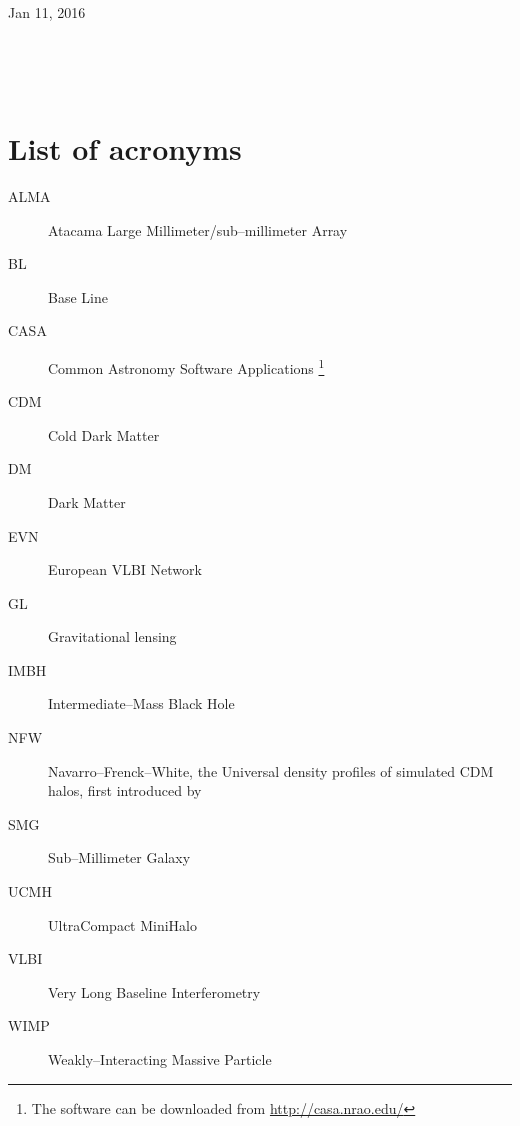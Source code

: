 \documentclass[a4wide,12pt]{book}
\begin{document}
\vspace{1.2cm}

\begin{center}
\large{Jan 11, 2016}\\
\end{center}
\thispagestyle{empty}
\fancyhf{}
\fancyhead{}
\rule[1cm]{0cm}{0.0cm} \\
\scriptsize{\emph{}\\
\clearpage
\normalsize
{}
\fancyhf{}
\fancyhead{}

\renewcommand{\chaptername}{}
\renewcommand{\chaptermark}[1]{\markboth{#1}{}}
\renewcommand{\sectionmark}[1]{\markright{#1}{}}
\fancyhead[RE]{\it \textbf{ }}

\fancyhead[LE]{\thepage}
\fancyhead[RO]{\thepage}

\renewcommand{\headrulewidth}{0.4pt}



\chapter*{List of acronyms}

\begin{description}
\item[ALMA]
Atacama Large Millimeter/sub--millimeter Array
\item[BL]
Base Line
\item[CASA]
Common Astronomy Software Applications \footnote{The software can be downloaded from \url{http://casa.nrao.edu/}}
\item[CDM]
Cold Dark Matter
\item[DM]
Dark Matter
\item[EVN]
European VLBI Network
\item[GL]
Gravitational lensing
\item[IMBH]
Intermediate--Mass Black Hole
\item[NFW]
Navarro--Frenck--White, the Universal density profiles of simulated CDM halos, first introduced by \citet{NFW}
\item[SMG]
Sub--Millimeter Galaxy
\item[UCMH]
UltraCompact MiniHalo
\item[VLBI]
Very Long Baseline Interferometry
\item[WIMP]
Weakly--Interacting Massive Particle
\end{description}

\clearpage

}
\end{document}
